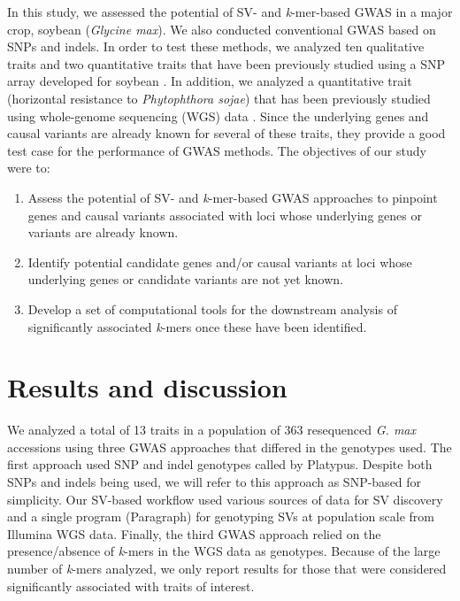 \documentclass[doublespacing]{bmcart}
\begin{document}
In this study, we assessed the potential of SV- and \emph{k}-mer-based GWAS in
a major crop, soybean (\emph{Glycine max}). We also conducted conventional GWAS
based on SNPs and indels. In order to test these methods, we analyzed ten
qualitative traits \cite{bandillo2017} and two quantitative traits
\cite{bandillo2015} that have been previously studied using a SNP array
developed for soybean \cite{song2013}. In addition, we analyzed a quantitative
trait (horizontal resistance to \emph{Phytophthora sojae}) that has been
previously studied using whole-genome sequencing (WGS) data
\cite{deronne2022}.  Since the underlying genes and causal variants are
already known for several of these traits, they provide a good test case for
the performance of GWAS methods.  The objectives of our study were to:

\begin{enumerate}
	\item Assess the potential of SV- and \emph{k}-mer-based GWAS approaches to
		pinpoint genes and causal variants associated with loci whose
		underlying genes or variants are already known.
	\item Identify potential candidate genes and/or causal variants at loci
		whose underlying genes or candidate variants are not yet known.
	\item Develop a set of computational tools for the downstream analysis
		of significantly associated \emph{k}-mers once these have been
		identified.
\end{enumerate}

\section*{Results and discussion}

We analyzed a total of 13 traits in a population of 363 resequenced \textit{G.
max} accessions using three GWAS approaches that differed in the genotypes
used. The first approach used SNP and indel genotypes called by Platypus.
Despite both SNPs and indels being used, we will refer to this approach as
SNP-based for simplicity. Our SV-based workflow used various sources of data
for SV discovery and a single program (Paragraph) for genotyping SVs at
population scale from Illumina WGS data. Finally, the third GWAS approach
relied on the presence/absence of \textit{k}-mers in the WGS data as genotypes.
Because of the large number of \textit{k}-mers analyzed, we only report results
for those that were considered significantly associated with traits of
interest.
\end{document}
